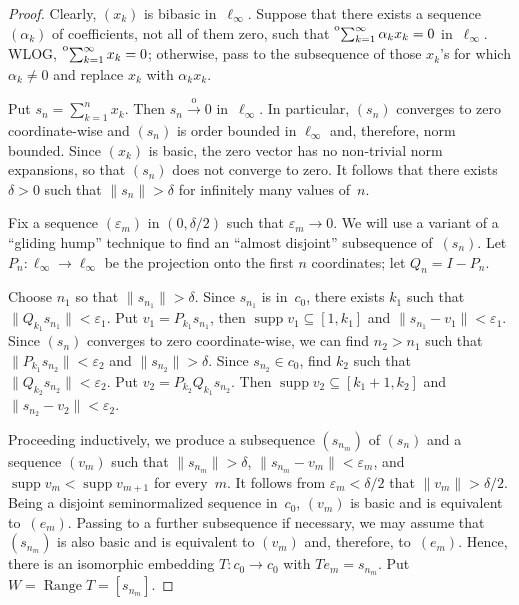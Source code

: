 \documentclass[12pt]{amsart}
\theoremstyle{plain}
\theoremstyle{definition}
\newcommand{\norm}[1]{\lVert#1\rVert}
\newcommand{\goeso}{\xrightarrow{\mathrm{o}}}	%
\newcommand{\tos}{\prescript{{\rm o}}{}{\sum_{k=1}^\infty\,}}
\DeclareMathOperator{\Range}{Range}
\DeclareMathOperator{\supp}{supp}
\begin{document}
\begin{proof}
  Clearly, $(x_k)$ is bibasic in~$\ell_\infty$.  Suppose that there
  exists a sequence $(\alpha_k)$ of coefficients, not all of them
  zero, such that $\tos\alpha_kx_k=0$ in~$\ell_\infty$. WLOG,
  $\tos x_k=0$; otherwise, pass to the subsequence of those $x_k$'s for
  which $\alpha_k\ne 0$ and replace $x_k$ with $\alpha_kx_k$.

  Put $s_n=\sum_{k=1}^nx_k$. Then $s_n\goeso 0$ in~$\ell_\infty$. In
  particular, $(s_n)$ converges to zero coordinate-wise and $(s_n)$ is
  order bounded in $\ell_\infty$ and, therefore, norm bounded. Since
  $(x_k)$ is basic, the zero vector has no non-trivial norm
  expansions, so that $(s_n)$ does not converge to zero. It follows
  that there exists $\delta>0$ such that $\norm{s_n}>\delta$ for
  infinitely many values of~$n$.

  Fix a sequence $(\varepsilon_m)$ in $(0,\delta/2)$ such that
  $\varepsilon_m\to 0$.  We will use a variant of a ``gliding hump''
  technique to find an ``almost disjoint'' subsequence of~$(s_n)$. Let
  $P_n\colon\ell_\infty\to\ell_\infty$ be the projection onto the
  first $n$ coordinates; let $Q_n=I-P_n$.

  Choose $n_1$ so that $\norm{s_{n_1}}>\delta$. Since $s_{n_1}$ is
  in~$c_0$, there exists $k_1$ such that
  $\norm{Q_{k_1}s_{n_1}}<\varepsilon_1$. Put $v_1=P_{k_1}s_{n_1}$,
  then $\supp v_1\subseteq[1,k_1]$ and
  $\norm{s_{n_1}-v_1}<\varepsilon_1$. Since $(s_n)$ converges to zero
  coordinate-wise, we can find $n_2>n_1$ such that
  $\norm{P_{k_1}s_{n_2}}<\varepsilon_2$ and
  $\norm{s_{n_2}}>\delta$. Since $s_{n_2}\in c_0$, find $k_2$ such
  that $\norm{Q_{k_2}s_{n_2}}<\varepsilon_2$. Put
  $v_2=P_{k_2}Q_{k_1}s_{n_2}$. Then $\supp v_2\subseteq[k_1+1,k_2]$
  and $\norm{s_{n_2}-v_2}<\varepsilon_2$.

  Proceeding inductively, we produce a subsequence $(s_{n_m})$ of
  $(s_n)$ and a sequence $(v_m)$ such that $\norm{s_{n_m}}>\delta$,
  $\norm{s_{n_m}-v_m}<\varepsilon_m$, and $\supp v_m<\supp v_{m+1}$
  for every~$m$. It follows from $\varepsilon_m<\delta/2$ that
  $\norm{v_m}>\delta/2$. Being a disjoint seminormalized sequence
  in~$c_0$, $(v_m)$ is basic and is equivalent to~$(e_m)$. Passing to
  a further subsequence if necessary, we may assume that $(s_{n_m})$
  is also basic and is equivalent to $(v_m)$ and, therefore,
  to~$(e_m)$. Hence, there is an isomorphic embedding
  $T\colon c_0\to c_0$ with $Te_m=s_{n_m}$. Put
  $W=\Range T=[s_{n_m}]$.


\end{proof}
\end{document}
